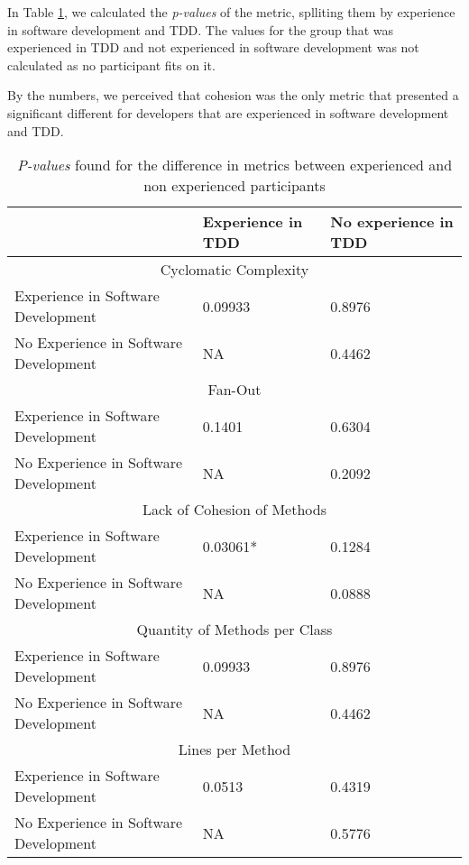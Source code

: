 \documentclass[times]{speauth}
\begin{document}
In Table \ref{valores-separados}, we calculated the \textit{p-values} of the metric,
splliting them by experience in software development and TDD. The values for the group that
was experienced in TDD and not experienced in software development was not calculated as no
participant fits on it.

By the numbers, we perceived that cohesion was the only metric that presented a significant
different for developers that are experienced in software development and TDD.

\begin{table}
	\centering
	\begin{tabular}{ | p{5cm} | p{3.5cm} | p{3.5cm} | }
		\hline
		  & \textbf{Experience in TDD} & \textbf{No experience in TDD} \\
		\hline
			\multicolumn{3}{|c|}{Cyclomatic Complexity} \\
		\hline
			Experience in Software Development 		& 0.09933	&	0.8976\\
			\hline
			No Experience in Software Development 	& NA		&	0.4462\\
		\hline
			\multicolumn{3}{|c|}{Fan-Out}\\
		\hline
			Experience in Software Development 		& 0.1401	&	0.6304\\
			\hline
			No Experience in Software Development 	& NA		&	0.2092\\
		\hline
			\multicolumn{3}{|c|}{Lack of Cohesion of Methods}\\
		\hline
			Experience in Software Development 		& \cellcolor[gray]{0.8}0.03061*	&	0.1284\\
			\hline
			No Experience in Software Development 	& NA		&	0.0888\\
		\hline
			\multicolumn{3}{|c|}{Quantity of Methods per Class} \\
		\hline
			Experience in Software Development 		& 0.09933	&	0.8976\\
			\hline
			No Experience in Software Development 	& NA		&	0.4462\\
		\hline
			\multicolumn{3}{|c|}{Lines per Method}\\
		\hline
			Experience in Software Development 		& 0.0513	&	0.4319\\
			\hline
			No Experience in Software Development 	& NA		&	0.5776\\
		\hline
	\end{tabular}
	\caption{\textit{P-values} found for the difference in metrics between experienced and non experienced participants}
	\label{valores-separados}
\end{table}
\end{document}
